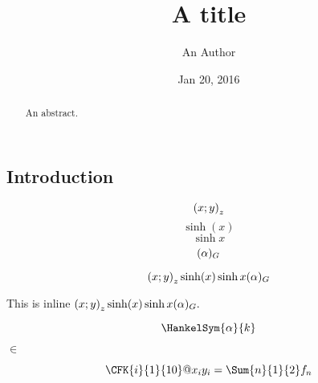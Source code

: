 \documentclass[11pt]{article}
\begin{document}
\title{A title}
\author{An Author}
\date{Jan 20, 2016}
\maketitle
\begin{abstract}
An abstract.
\end{abstract}
%

\subsection*{Introduction}
\label{sec_intro}

\[
\left(x;y\right)_{z}
\]
\[
\sinh(x)
\]
\[
\sinh{x}
\]
\[
(\alpha)_G
\]

$$
\left(x;y\right)_{z}
\sinh(x)
\sinh{x}
(\alpha)_G
$$

\vspace{0.2cm}
\noindent This is inline
$
\left(x;y\right)_{z}
\sinh(x)
\sinh{x}
(\alpha)_G.
$
\vspace{1cm}

\[
\HankelSym{\alpha}{k}
\]


\noindent 
$\in$

\[
\CFK{i}{1}{10}@{x_i}{y_i}
=
\Sum{n}{1}{2} f_n
\]
\end{document}
